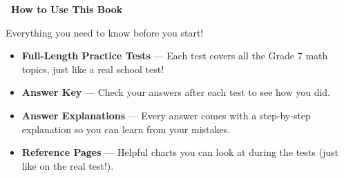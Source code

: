 
\thispagestyle{empty}

{
\sffamily

\begin{center}
    \textcolor{funBlueDark}{\fontsize{24}{28}\selectfont\bfseries
    \faBook~How to Use This Book~\faBook}

    \medskip
    \textcolor{funGray}{\normalsize Everything you need to know before you start!}
\end{center}

\vspace{4mm}

\begin{tcolorbox}[
    enhanced,
    colback=funGreenLight,
    colframe=funGreen!50,
    arc=8pt, boxrule=1pt,
    left=5mm, right=5mm, top=3mm, bottom=3mm,
    title={\textcolor{white}{\faListOl~What's Inside This Book}},
    colbacktitle=funGreen!70,
    fonttitle=\bfseries\sffamily,
]
    \small
    \begin{itemize}[leftmargin=*, itemsep=3pt]
        \item \textbf{Full-Length Practice Tests} --- Each test covers all the Grade 7 math
            topics, just like a real school test!
        \item \textbf{Answer Key} --- Check your answers after each test to see how you did.
        \item \textbf{Answer Explanations} --- Every answer comes with a step-by-step explanation
            so you can learn from your mistakes.
        \item \textbf{Reference Pages} --- Helpful charts you can look at during the tests
            (just like on the real test!).
    \end{itemize}
\end{tcolorbox}

\vspace{2mm}

}
